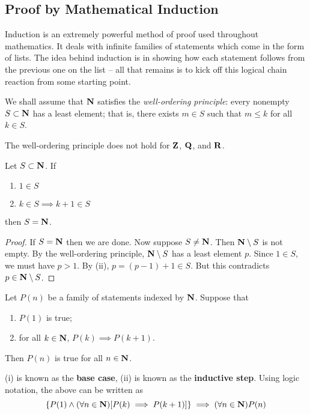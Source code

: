 \subsection{Proof by Mathematical Induction}
Induction is an extremely powerful method of proof used throughout mathematics. It deals with infinite families of statements which come in the form of lists. The idea behind induction is in showing how each statement follows from the previous one on the list -- all that remains is to kick off this logical chain reaction from some starting point.

We shall assume that $\mathbf N$ satisfies the \emph{well-ordering principle}: every nonempty $S\subset\mathbf N$ has a least element; that is, there exists $m\in S$ such that $m\le k$ for all $k\in S$.

\begin{remark}
The well-ordering principle does not hold for $\mathbf Z$, $\mathbf Q$, and $\mathbf R$.
\end{remark}

\begin{lemma}
Let $S\subset\mathbf N$. If
\begin{enumerate}[label=(\roman*)]
\item $1\in S$
\item $k\in S\implies k+1\in S$
\end{enumerate}
then $S=\mathbf N$.
\end{lemma}

\begin{proof}
If $S=\mathbf N$ then we are done. Now suppose $S\neq\mathbf N$. Then $\mathbf N\setminus S$ is not empty. By the well-ordering principle, $\mathbf N\setminus S$ has a least element $p$. Since $1\in S$, we must have $p>1$. By (ii), $p=(p-1)+1\in S$. But this contradicts $p\in\mathbf N\setminus S$.
\end{proof}

\begin{theorem}\label{thrm:pmi}
Let $P(n)$ be a family of statements indexed by $\mathbf N$. Suppose that 
\begin{enumerate}[label=(\roman*)]
\item $P(1)$ is true;
\item for all $k\in\mathbf N$, $P(k)\implies P(k+1)$.
\end{enumerate}
Then $P(n)$ is true for all $n\in\mathbf N$.
\end{theorem}

(i) is known as the \textbf{base case}, (ii) is known as the \textbf{inductive step}. Using logic notation, the above can be written as
\[ \{P(1) \land (\forall n \in \mathbf N) [P(k) \implies P(k+1)]\} \implies (\forall n \in \mathbf N)P(n) \]

